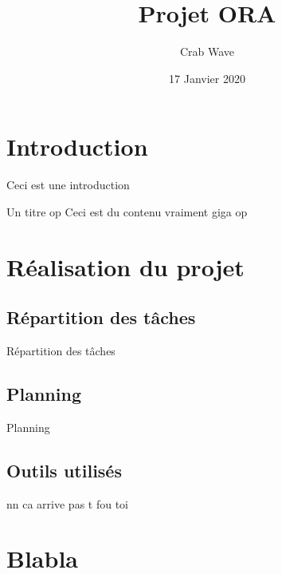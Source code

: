 \documentclass[11pt, a4paper]{specifications}
\title{Projet ORA}
\author{Crab Wave}
\date{17 Janvier 2020}
\begin{document}
	\bodyfont

	\maketitle
	\thispagestyle{empty}   %
	\clearpage

	\tableofcontents
	\clearpage

	\section{Introduction}
	Ceci est une introduction	
	\begin{boxed}{Un titre op}
		Ceci est du contenu vraiment giga op
	\end{boxed}
	\section{Réalisation du projet}
	\subsection{Répartition des tâches}
	Répartition des tâches
	\subsection{Planning}
	Planning
	\subsection{Outils utilisés}
	nn ca arrive pas t fou toi
	\clearpage
	\section{Blabla}
	\lipsum
\end{document}
